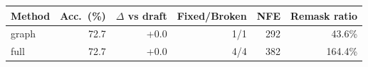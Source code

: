 \begin{tabular}{lrrrrr}
\toprule
Method & Acc.\ (\%) & $\Delta$ vs draft & Fixed/Broken & NFE & Remask ratio \\
\midrule
graph & 72.7 & +0.0 & 1/1 & 292 & 43.6\% \\
full & 72.7 & +0.0 & 4/4 & 382 & 164.4\% \\
\bottomrule
\end{tabular}
